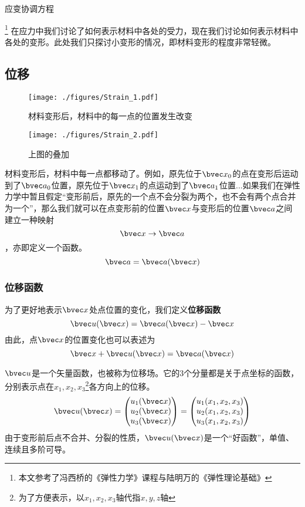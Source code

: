 
\begin{issues}
\issueTODO 
应变协调方程
\end{issues}

\footnote{本文参考了冯西桥的《弹性力学》课程与陆明万的《弹性理论基础》}
在应力中我们讨论了如何表示材料中各处的受力，现在我们讨论如何表示材料中各处的变形。此处我们只探讨小变形的情况，即材料变形的程度非常轻微。
\subsection{位移}
\begin{figure}[ht]
\centering
\texttt{[image: ./figures/Strain\_1.pdf]}
\caption{材料变形后，材料中的每一点的位置发生改变} \label{Strain_fig1}
\end{figure}
\begin{figure}[ht]
\centering
\texttt{[image: ./figures/Strain\_2.pdf]}
\caption{上图的叠加} \label{Strain_fig2}
\end{figure}

材料变形后，材料中每一点都移动了。例如，原先位于$\bvec x_0$的点在变形后运动到了$\bvec a_0$位置，原先位于$\bvec x_1$的点运动到了$\bvec a_1$位置...如果我们在弹性力学中暂且假定“变形前后，原先的一个点不会分裂为两个，也不会有两个点合并为一个”，那么我们就可以在点变形前的位置$\bvec x$与变形后的位置$\bvec a$之间建立一种映射$$\bvec x\rightarrow \bvec a$$，亦即定义一个函数。$$\bvec a = \bvec a (\bvec x)$$

\subsubsection{位移函数}
为了更好地表示$\bvec x$处点位置的变化，我们定义\textbf{位移函数}
\begin{equation}
\bvec u (\bvec x) =\bvec a (\bvec x) - \bvec x
\end{equation}
由此，点$\bvec x$的位置变化也可以表述为
\begin{equation}
\bvec x + \bvec u (\bvec x) =\bvec a (\bvec x) 
\end{equation}

$\bvec u$是一个矢量函数，也被称为位移场。它的3个分量都是关于点坐标的函数，分别表示点在$x_1, x_2, x_3$\footnote{为了方便表示，以$x_1, x_2, x_3$轴代指$x,y,z$轴}各方向上的位移。
$$\bvec u(\bvec x) = 
\begin{pmatrix}
u_1(\bvec x)\\
u_2(\bvec x)\\
u_3(\bvec x)\\
\end{pmatrix}
=
\begin{pmatrix}
u_1(x_1, x_2, x_3)\\
u_2(x_1, x_2, x_3)\\
u_3(x_1, x_2, x_3)\\
\end{pmatrix}
$$
由于变形前后点不合并、分裂的性质，$\bvec u(\bvec x)$是一个“好函数”，单值、连续且多阶可导。

